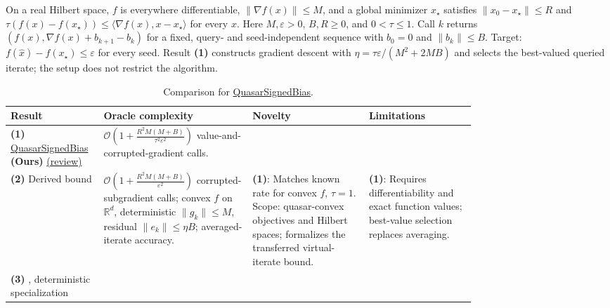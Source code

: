 \begin{table}[tp]
\centering
\caption{Comparison for \href{https://github.com/k3nfalt/longtails/blob/main/LongTails/Setups/QuasarSignedBias.lean}{QuasarSignedBias}.}\label{tab:QuasarSignedBias}
\parbox{\linewidth}{\footnotesize On a real Hilbert space, $f$ is everywhere differentiable, $\|\nabla f(x)\|\le M$, and a global minimizer $x_\star$ satisfies $\|x_0-x_\star\|\le R$ and $\tau(f(x)-f(x_\star))\le\langle\nabla f(x),x-x_\star\rangle$ for every $x$. Here $M,\varepsilon>0$, $B,R\ge0$, and $0<\tau\le1$. Call $k$ returns $(f(x),\nabla f(x)+b_{k+1}-b_k)$ for a fixed, query- and seed-independent sequence with $b_0=0$ and $\|b_k\|\le B$. Target: $f(\hat x)-f(x_\star)\le\varepsilon$ for every seed. Result \textbf{(1)} constructs gradient descent with $\eta=\tau\varepsilon/(M^2+2MB)$ and selects the best-valued queried iterate; the setup does not restrict the algorithm.}\par\smallskip
\begin{threeparttable}
\footnotesize
\setlength{\tabcolsep}{4pt}\renewcommand{\arraystretch}{1.25}
\begin{tabularx}{\linewidth}{@{}>{\raggedright\arraybackslash}p{0.20\linewidth}>{\raggedright\arraybackslash}p{0.32\linewidth}>{\raggedright\arraybackslash}p{0.25\linewidth}>{\raggedright\arraybackslash}X@{}}
\toprule
\textbf{Result} & \textbf{Oracle complexity} & \textbf{Novelty} & \textbf{Limitations} \\
\midrule
\textbf{(1)} \href{https://github.com/k3nfalt/longtails/blob/main/LongTails/Theorems/QuasarSignedBias.lean}{Quasar\allowbreak Signed\allowbreak Bias} \textbf{(Ours)} \href{https://github.com/k3nfalt/longtails/blob/main/scripts/reviews/QuasarSignedBias.md}{(review)}
& $\mathcal{O}\!\left(1+\frac{R^2M(M+B)}{\tau^2\varepsilon^2}\right)$ value-and-corrupted-gradient calls.
& & \\
\midrule[1.2pt]
\textbf{(2)} Derived bound \citep[App.~B.6]{qsbKarimireddy2019}
& $\mathcal{O}\!\left(1+\frac{R^2M(M+B)}{\varepsilon^2}\right)$ corrupted-subgradient calls; convex $f$ on $\mathbb R^d$, deterministic $\|g_k\|\le M$, residual $\|e_k\|\le\eta B$; averaged-iterate accuracy.
& \textbf{(1)}: Matches known rate for convex $f$, $\tau=1$. Scope: quasar-convex objectives and Hilbert spaces; formalizes the transferred virtual-iterate bound.
& \textbf{(1)}: Requires differentiability and exact function values; best-value selection replaces averaging. \\
\midrule
\textbf{(3)} \citep[Thm.~5.1, v3]{qsbJin2020v3}, deterministic specialization

\end{tabularx}
\end{threeparttable}
\end{table}
